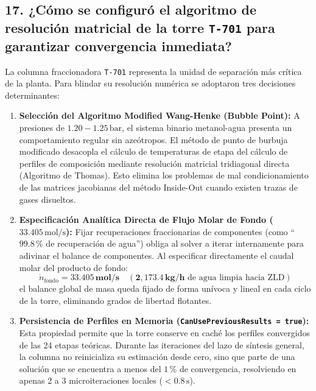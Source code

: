 \documentclass[11pt,a4paper]{article}
\begin{document}
\subsection{17. ¿Cómo se configuró el algoritmo de resolución matricial de la torre \texttt{T-701} para garantizar convergencia inmediata?}
La columna fraccionadora \texttt{T-701} representa la unidad de separación más crítica de la planta. Para blindar su resolución numérica se adoptaron tres decisiones determinantes:
\begin{enumerate}
    \item \textbf{Selección del Algoritmo Modified Wang-Henke (Bubble Point):}  
    A presiones de $1.20 - 1.25\,\text{bar}$, el sistema binario metanol-agua presenta un comportamiento regular sin azeótropos. El método de punto de burbuja modificado desacopla el cálculo de temperaturas de etapa del cálculo de perfiles de composición mediante resolución matricial tridiagonal directa (Algoritmo de Thomas). Esto elimina los problemas de mal condicionamiento de las matrices jacobianas del método Inside-Out cuando existen trazas de gases disueltos.
    
    \item \textbf{Especificación Analítica Directa de Flujo Molar de Fondo ($33.405\,\text{mol/s}$):}  
    Fijar recuperaciones fraccionarias de componentes (como ``$99.8\,\%$ de recuperación de agua'') obliga al solver a iterar internamente para adivinar el balance de componentes. Al especificar directamente el caudal molar del producto de fondo:
    \begin{equation}
        \dot{n}_{\text{fondo}} = \mathbf{33.405\,\text{mol/s}} \quad (\mathbf{2{,}173.4\,\text{kg/h}}\text{ de agua limpia hacia ZLD})
    \end{equation}
    el balance global de masa queda fijado de forma unívoca y lineal en cada ciclo de la torre, eliminando grados de libertad flotantes.

    \item \textbf{Persistencia de Perfiles en Memoria (\texttt{CanUsePreviousResults = true}):}  
    Esta propiedad permite que la torre conserve en caché los perfiles convergidos de las 24 etapas teóricas. Durante las iteraciones del lazo de síntesis general, la columna no reinicializa su estimación desde cero, sino que parte de una solución que se encuentra a menos del $1\,\%$ de convergencia, resolviendo en apenas 2 a 3 microiteraciones locales ($<0.8\,\text{s}$).
\end{enumerate}
\end{document}
